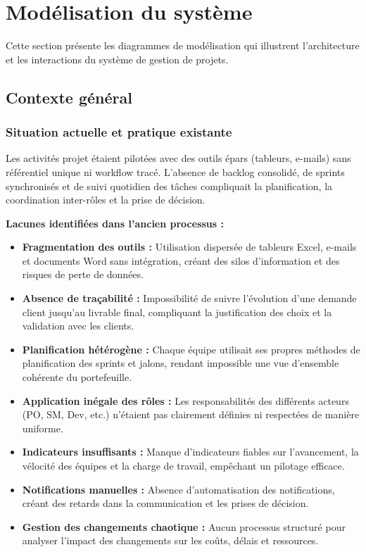 \section{Modélisation du système}

Cette section présente les diagrammes de modélisation qui illustrent l'architecture et les interactions du système de gestion de projets.

\subsection{Contexte général}

\subsubsection{Situation actuelle et pratique existante}

Les activités projet étaient pilotées avec des outils épars (tableurs, e-mails) sans référentiel unique ni workflow tracé. L'absence de backlog consolidé, de sprints synchronisés et de suivi quotidien des tâches compliquait la planification, la coordination inter-rôles et la prise de décision.

\textbf{Lacunes identifiées dans l'ancien processus :}
\begin{itemize}
    \item \textbf{Fragmentation des outils :} Utilisation dispersée de tableurs Excel, e-mails et documents Word sans intégration, créant des silos d'information et des risques de perte de données.
    \item \textbf{Absence de traçabilité :} Impossibilité de suivre l'évolution d'une demande client jusqu'au livrable final, compliquant la justification des choix et la validation avec les clients.
    \item \textbf{Planification hétérogène :} Chaque équipe utilisait ses propres méthodes de planification des sprints et jalons, rendant impossible une vue d'ensemble cohérente du portefeuille.
    \item \textbf{Application inégale des rôles :} Les responsabilités des différents acteurs (PO, SM, Dev, etc.) n'étaient pas clairement définies ni respectées de manière uniforme.
    \item \textbf{Indicateurs insuffisants :} Manque d'indicateurs fiables sur l'avancement, la vélocité des équipes et la charge de travail, empêchant un pilotage efficace.
    \item \textbf{Notifications manuelles :} Absence d'automatisation des notifications, créant des retards dans la communication et les prises de décision.
    \item \textbf{Gestion des changements chaotique :} Aucun processus structuré pour analyser l'impact des changements sur les coûts, délais et ressources.
\end{itemize}

